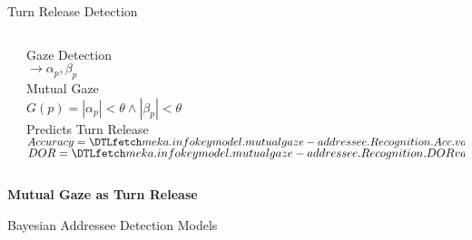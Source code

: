 \begin{frame}{Turn Release Detection}
  \begin{columns}[T] %
    \begin{column}{.64\textwidth}
    \end{column}%
    \begin{column}{.35\textwidth}
      \vspace{15pt}
      \small
      Gaze Detection\\
      \hspace{20pt}\(\rightarrow \alpha_p, \beta_p\)\\
      \vspace{5pt}
      \pause
      Mutual Gaze\\
      \hspace{20pt}\(G(p) = | \alpha_p | < \theta \land | \beta_p | < \theta\)\\
      \vspace{5pt}
      \pause
      Predicts Turn Release\\
      \hspace{20pt}\(Accuracy = \inidata{meka.info}{model.mutualgaze-addressee.Recognition.Acc.}\)\\
      \hspace{20pt}\(DOR = \inidata{meka.info}{model.mutualgaze-addressee.Recognition.DOR}\)\\
      \vspace{5pt}
    \end{column}%
    \end{columns}
    \centering
    \pause
    \vspace{1.5pt}
      \textcolor{mygreen}{\faCheckCircle} \textbf{Mutual Gaze as Turn Release}\\
\end{frame}
\begin{frame}{Bayesian Addressee Detection Models}
  \centering
  \begin{figure}[tbh]
  \end{figure}
\end{frame}
